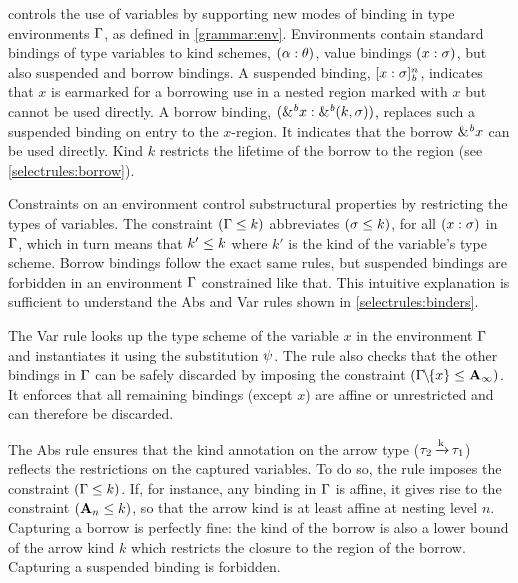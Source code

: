 \lang controls the use of variables by supporting new modes of
binding in type environments $\Gamma$, as defined in \cref{grammar:env}.
Environments contain standard bindings of type variables to kind schemes,
$(\alpha : \theta)$, value bindings $(x : \sigma)$, but also
suspended and borrow bindings.
A suspended binding, $[x : \sigma]_{\textit{b}}^n$, indicates that $x$ is
earmarked for a borrowing use in a nested region
marked with $x$ %
but
cannot be used directly.
A borrow binding, $({\&}^{\textit{b}}x : {\&}^{\textit{b}}(k,\sigma))$, replaces
such a suspended binding on entry to the $x$-region. It indicates
that the borrow ${\&}^{\textit{b}}x$ can be used directly. Kind $k$
restricts the lifetime of the borrow to the region (see \cref{selectrules:borrow}).


Constraints on an environment control substructural properties by
restricting the types of variables.  The constraint $(\Gamma \leq k)$
abbreviates $(\sigma \leq k)$, for all $(x : \sigma)$
in $\Gamma$, which in turn means that $k' \leq k$ where $k'$ is the kind of
the variable's type scheme.
Borrow bindings follow the exact same rules, but suspended bindings
are forbidden in an environment $\Gamma$ constrained like that.
This intuitive explanation is sufficient to understand
the {\sc Abs} and {\sc Var} rules shown in
\cref{selectrules:binders}.

The {\sc Var} rule looks up the type scheme of the variable $x$ in
the environment $\Gamma$
and instantiates it using the substitution $\mathrm{\psi}$. The rule also
checks that the other bindings in $\Gamma$ can be safely discarded by
imposing the constraint $(\Gamma\!\!\mathbin{\setminus}\!\!\{x\} \leq \mathbf{A}_\infty)$.
It enforces that all remaining bindings (except $x$) are affine or
unrestricted and can therefore be discarded.

The {\sc Abs} rule ensures that the kind annotation on the arrow type
($\tau_2 \operatorname{\xrightarrow{k}} \tau_1$) reflects the restrictions on the captured variables.
To do so, the rule imposes the constraint $(\Gamma \leq k)$.
If, for instance, any binding in $\Gamma$ is affine, it gives rise to the
constraint $(\mathbf{A}_n \leq k)$, so that  the arrow kind is at least
affine at nesting level $n$.
Capturing a borrow is perfectly fine: the kind of the borrow is also a
lower bound of the arrow kind $k$ which restricts the closure
to the region of the borrow.
Capturing a suspended binding is forbidden.




